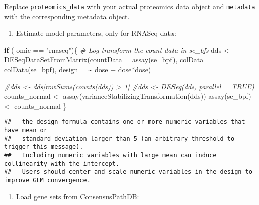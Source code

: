 \documentclass[
]{article}
\newenvironment{Shaded}{\begin{snugshade}}{\end{snugshade}}
\newcommand{\AttributeTok}[1]{\textcolor[rgb]{0.77,0.63,0.00}{#1}}
\newcommand{\CommentTok}[1]{\textcolor[rgb]{0.56,0.35,0.01}{\textit{#1}}}
\newcommand{\ControlFlowTok}[1]{\textcolor[rgb]{0.13,0.29,0.53}{\textbf{#1}}}
\newcommand{\FunctionTok}[1]{\textcolor[rgb]{0.00,0.00,0.00}{#1}}
\newcommand{\NormalTok}[1]{#1}
\newcommand{\OtherTok}[1]{\textcolor[rgb]{0.56,0.35,0.01}{#1}}
\newcommand{\SpecialCharTok}[1]{\textcolor[rgb]{0.00,0.00,0.00}{#1}}
\newcommand{\StringTok}[1]{\textcolor[rgb]{0.31,0.60,0.02}{#1}}
\providecommand{\tightlist}{%
  \setlength{\itemsep}{0pt}\setlength{\parskip}{0pt}}
\begin{document}
Replace \texttt{proteomics\_data} with your actual proteomics data
object and \texttt{metadata} with the corresponding metadata object.

\begin{enumerate}
\def\labelenumi{\arabic{enumi}.}
\setcounter{enumi}{2}
\tightlist
\item
  Estimate model parameters, only for RNASeq data:
\end{enumerate}

\begin{Shaded}
\begin{Highlighting}[]
\ControlFlowTok{if}\NormalTok{ ( omic }\SpecialCharTok{==} \StringTok{"rnaseq"}\NormalTok{)\{}
\CommentTok{\# Log{-}transform the count data in se\_bfs}
\NormalTok{  dds }\OtherTok{\textless{}{-}} \FunctionTok{DESeqDataSetFromMatrix}\NormalTok{(}\AttributeTok{countData =} \FunctionTok{assay}\NormalTok{(se\_bpf),}
                                \AttributeTok{colData   =} \FunctionTok{colData}\NormalTok{(se\_bpf),}
                                \AttributeTok{design    =} \SpecialCharTok{\textasciitilde{}}\NormalTok{ dose }\SpecialCharTok{+}\NormalTok{ dose}\SpecialCharTok{*}\NormalTok{dose)}
  
  \CommentTok{\#dds \textless{}{-} dds[rowSums(counts(dds)) \textgreater{} 1]}
  \CommentTok{\#dds \textless{}{-} DESeq(dds, parallel = TRUE)}
\NormalTok{  counts\_normal }\OtherTok{\textless{}{-}} \FunctionTok{assay}\NormalTok{(}\FunctionTok{varianceStabilizingTransformation}\NormalTok{(dds))}
  \FunctionTok{assay}\NormalTok{(se\_bpf) }\OtherTok{\textless{}{-}}\NormalTok{ counts\_normal}
\NormalTok{\}}
\end{Highlighting}
\end{Shaded}

\begin{verbatim}
##   the design formula contains one or more numeric variables that have mean or
##   standard deviation larger than 5 (an arbitrary threshold to trigger this message).
##   Including numeric variables with large mean can induce collinearity with the intercept.
##   Users should center and scale numeric variables in the design to improve GLM convergence.
\end{verbatim}

\begin{enumerate}
\def\labelenumi{\arabic{enumi}.}
\setcounter{enumi}{3}
\tightlist
\item
  Load gene sets from ConsensusPathDB:
\end{enumerate}
\end{document}
